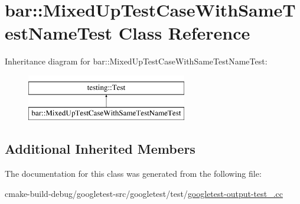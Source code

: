 \hypertarget{classbar_1_1MixedUpTestCaseWithSameTestNameTest}{}\section{bar\+::Mixed\+Up\+Test\+Case\+With\+Same\+Test\+Name\+Test Class Reference}
\label{classbar_1_1MixedUpTestCaseWithSameTestNameTest}
Inheritance diagram for bar\+::Mixed\+Up\+Test\+Case\+With\+Same\+Test\+Name\+Test\+:\begin{figure}[H]
\begin{center}
\leavevmode
\includegraphics[height=2.000000cm]{classbar_1_1MixedUpTestCaseWithSameTestNameTest}
\end{center}
\end{figure}
\subsection*{Additional Inherited Members}


The documentation for this class was generated from the following file\+:\begin{DoxyCompactItemize}
\item 
cmake-\/build-\/debug/googletest-\/src/googletest/test/\mbox{\hyperlink{googletest-output-test___8cc}{googletest-\/output-\/test\+\_\+.\+cc}}\end{DoxyCompactItemize}
